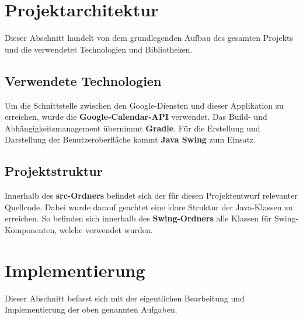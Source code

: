 \documentclass[a4paper]{article}
\begin{document}
	
	\section{Projektarchitektur}
	Dieser Abschnitt handelt von dem grundlegenden Aufbau des gesamten Projekts und die verwendetet Technologien und Bibliotheken.
	
	\subsection{Verwendete Technologien}
	Um die Schnittstelle zwischen den Google-Diensten und dieser Applikation zu erreichen, wurde die \textbf{Google-Calendar-API} verwendet.
	Das Build- und Abhängigkeitsmanagement übernimmt \textbf{Gradle}. Für die Erstellung und Darstellung der Benutzeroberfläche kommt \textbf{Java Swing} zum Einsatz.
	
	\subsection{Projektstruktur}
	Innerhalb des \textbf{src-Ordners} befindet sich der für diesen Projektentwurf relevanter Quellcode. Dabei wurde darauf geachtet eine klare Struktur der Java-Klassen zu erreichen. So befinden sich innerhalb des \textbf{Swing-Ordners} alle Klassen für Swing-Komponenten, welche verwendet wurden.
	\\
	
	\section{Implementierung}
	Dieser Abschnitt befasst sich mit der eigentlichen Bearbeitung und Implementierung der oben genannten Aufgaben.
	
\end{document}
